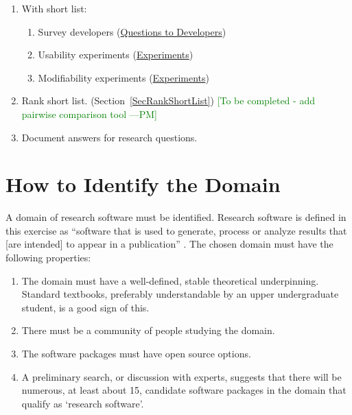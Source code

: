 \documentclass[letterpaper,cleveref]{lipics-v2019}
\newcommand{\authornote}[3]{\textcolor{#1}{[#3 ---#2]}}
\newcommand{\authornote}[3]{}
\newcommand{\wss}[1]{\authornote{blue}{SS}{#1}} %
\newcommand{\pmi}[1]{\authornote{green}{PM}{#1}} %
\theoremstyle{definition}
\begin{document}
\begin{enumerate}
\item With short list:
\begin{enumerate}
\item Survey developers (\href{https://github.com/smiths/AIMSS/blob/master/StateOfPractice/Methodology/Questions to Developers.pdf}{Questions to Developers})
\item Usability experiments (\href{https://github.com/smiths/AIMSS/blob/master/StateOfPractice/Methodology/Experiments.pdf}{Experiments})
\item Modifiability experiments (\href{https://github.com/smiths/AIMSS/blob/master/StateOfPractice/Methodology/Experiments.pdf}{Experiments})
\end{enumerate}
\item Rank short list. (Section~\ref{SecRankShortList}) \pmi{To be completed - add pairwise comparison tool}
\item Document answers for research questions.
\end{enumerate}


\section{How to Identify the Domain} \label{SecIdentifyDomain}
A domain of research software must be identified. Research software is defined in this exercise as ``software that is used to generate, process or analyze results that [are intended] to appear in a publication'' \citep{hettrick2014uk}. The chosen domain must have the following properties:

\begin{enumerate}	
	\item The domain must have a well-defined, stable theoretical underpinning. Standard textbooks, preferably understandable by an upper undergraduate student, is a good sign of this.
	\item There must be a community of people studying the domain.
	\item The software packages must have open source options. 
	\item A preliminary search, or discussion with experts, suggests that there will be numerous, at least about 15, candidate software packages in the domain that qualify as `research software'.
\end{enumerate}	
\end{document}
